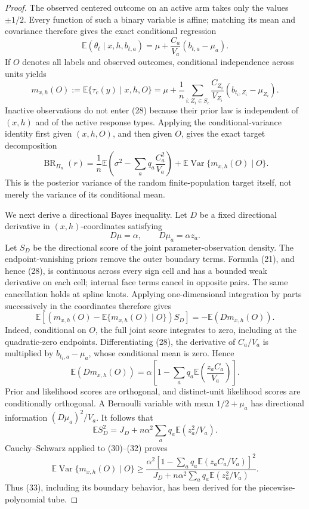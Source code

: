 \documentclass{article}
\begin{document}
\begin{proof}
The observed centered outcome on an active arm takes only the values \(\pm1/2\).  Every function of such a binary variable is affine; matching its mean and covariance therefore gives the exact conditional regression
\[
\mathbb E(\theta_t\mid x,h,b_{t,a})
=\mu+\frac{C_a}{V_a}(b_{t,a}-\mu_a).
\]
If \(O\) denotes all labels and observed outcomes, conditional independence across units yields
\[
m_{x,h}(O):=\mathbb E\{\tau_c(y)\mid x,h,O\}
=\mu+\frac1n\sum_{i:Z_i\in S_c}
\frac{C_{Z_i}}{V_{Z_i}}(b_{t_i,Z_i}-\mu_{Z_i}).
\tag{28}
\]
Inactive observations do not enter (28) because their prior law is independent of \((x,h)\) and of the active response types.  Applying the conditional-variance identity first given \((x,h,O)\), and then given \(O\), gives the exact target decomposition
\[
\operatorname{BR}_{\Pi_n}(r)
=\frac1n\mathbb E\left(\sigma^2-\sum_aq_a\frac{C_a^2}{V_a}\right)
+\mathbb E\operatorname{Var}\{m_{x,h}(O)\mid O\}.
\tag{29}
\]
This is the posterior variance of the random finite-population target itself, not merely the variance of its conditional mean.

We next derive a directional Bayes inequality.  Let \(D\) be a fixed directional derivative in \((x,h)\)-coordinates satisfying
\[
D\mu=\alpha,
\qquad
D\mu_a=\alpha z_a.
\]
Let \(S_D\) be the directional score of the joint parameter-observation density.  The endpoint-vanishing priors remove the outer boundary terms.  Formula (21), and hence (28), is continuous across every sign cell and has a bounded weak derivative on each cell; internal face terms cancel in opposite pairs.  The same cancellation holds at spline knots.  Applying one-dimensional integration by parts successively in the coordinates therefore gives
\[
\mathbb E\left[(m_{x,h}(O)-\mathbb E\{m_{x,h}(O)\mid O\})S_D\right]
=-\mathbb E(Dm_{x,h}(O)).
\tag{30}
\]
Indeed, conditional on \(O\), the full joint score integrates to zero, including at the quadratic-zero endpoints.  Differentiating (28), the derivative of \(C_a/V_a\) is multiplied by \(b_{t_i,a}-\mu_a\), whose conditional mean is zero.  Hence
\[
\mathbb E(Dm_{x,h}(O))
=\alpha\left[1-\sum_aq_a\mathbb E\left(\frac{z_aC_a}{V_a}\right)\right].
\tag{31}
\]
Prior and likelihood scores are orthogonal, and distinct-unit likelihood scores are conditionally orthogonal.  A Bernoulli variable with mean \(1/2+\mu_a\) has directional information \((D\mu_a)^2/V_a\).  It follows that
\[
\mathbb ES_D^2
=J_D+n\alpha^2\sum_aq_a\mathbb E(z_a^2/V_a).
\tag{32}
\]
Cauchy--Schwarz applied to (30)--(32) proves
\[
\mathbb E\operatorname{Var}\{m_{x,h}(O)\mid O\}
\ge
\frac{\alpha^2\left[1-\sum_aq_a\mathbb E(z_aC_a/V_a)\right]^2}
{J_D+n\alpha^2\sum_aq_a\mathbb E(z_a^2/V_a)}.
\tag{33}
\]
Thus (33), including its boundary behavior, has been derived for the piecewise-polynomial tube.


\end{proof}
\end{document}
